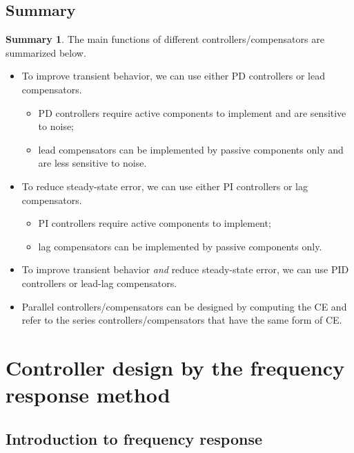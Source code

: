 \documentclass[a4paper,11pt]{report}
\theoremstyle{definition}
\newtheorem{mdsummary}{Summary}
\newenvironment{summary}%
  {\vspace{0.1cm}\begin{mdframed}[linecolor=red!60!black,
  linewidth=2pt]\begin{mdsummary}}%
  {\end{mdsummary}\end{mdframed}\vspace{0.1cm}}
\begin{document}
\section{Summary}


\begin{summary}
  \label{sum:controller}
  The main functions of different controllers/compensators are
  summarized below.
  \begin{itemize}
  \item To improve transient behavior, we can use either PD
    controllers or lead compensators.
    \begin{itemize}
    \item PD controllers require active components to implement and
      are sensitive to noise;
    \item lead compensators can be implemented by passive components
      only and are less sensitive to noise.
    \end{itemize}
  \item To reduce steady-state error, we can use either PI controllers
    or lag compensators.
    \begin{itemize}
    \item PI controllers require active components to implement;
    \item lag compensators can be implemented by passive components
      only.
    \end{itemize}
  \item To improve transient behavior \emph{and} reduce steady-state
    error, we can use PID controllers or lead-lag compensators.
  \item Parallel controllers/compensators can be designed by computing
    the CE and refer to the series controllers/compensators that have
    the same form of CE.
  \end{itemize}

\end{summary}


\chapter{Controller design by the frequency response method}
\label{chap:fr}

\section{Introduction to frequency response}
\end{document}
